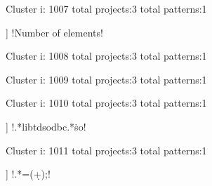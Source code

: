 Cluster i: 1007
total projects:3
total patterns:1
\begin{multicols}{1}
\begin{description}[noitemsep,topsep=0pt]
\item [[3] ] \cverb!Number of elements!
\end{description}
\end{multicols}







Cluster i: 1008
total projects:3
total patterns:1
\begin{multicols}{1}
\end{multicols}







Cluster i: 1009
total projects:3
total patterns:1
\begin{multicols}{1}
\end{multicols}







Cluster i: 1010
total projects:3
total patterns:1
\begin{multicols}{1}
\begin{description}[noitemsep,topsep=0pt]
\item [[3] ] \cverb!.*libtdsodbc.*\.so!
\end{description}
\end{multicols}







Cluster i: 1011
total projects:3
total patterns:1
\begin{multicols}{1}
\begin{description}[noitemsep,topsep=0pt]
\item [[3] ] \cverb!.*\s=\s(\d+)\s;!
\end{description}
\end{multicols}







